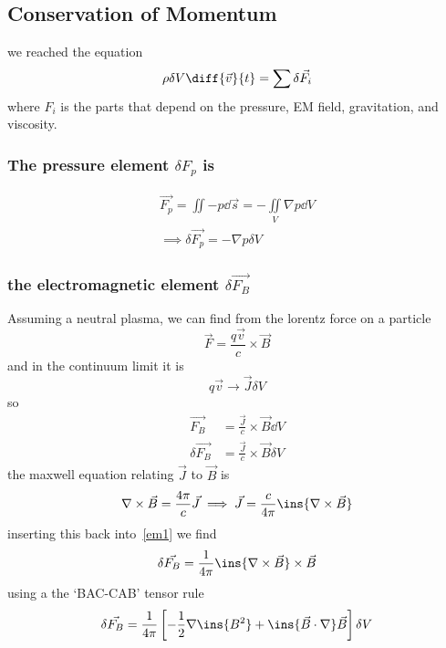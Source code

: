 \subsection{Conservation of Momentum}
we reached the equation
\begin{equation}\label{alltheforces}
    \rho\delta V \diff{\vec{v}}{t} = \sum \delta \vec{F_i}
\end{equation}
where \(F_i\) is the parts that depend on the pressure, EM field, gravitation, and viscosity. 
\subsubsection{The pressure element \(\delta F_p\) is}
\begin{align}
    \vec{F_p} = \iint -p\dd \vec{s} = -\iint\limits_V \nabla p \dd V\\
    \implies \delta \vec{F_p} = -\nabla p\delta V
\end{align}
\subsubsection{the electromagnetic element \(\delta\vec{F_B}\)} Assuming a neutral plasma, we can find from the lorentz force on a particle
\begin{equation}
    \vec{F} = \frac{q\vec{v}}{c}\times\vec{B}
\end{equation}
and in the continuum limit it is
\begin{equation}
    q\vec{v} \rightarrow \vec{J}\delta V
\end{equation}
so
\begin{align}
    \vec{F_B} &= \frac{\vec{J}}{c}\times \vec{B} \dd V\\
    \delta\vec{F_B} &= \frac{\vec{J}}{c}\times \vec{B}\delta V \label{em1}
\end{align}
the maxwell equation relating \(\vec{J}\) to \(\vec{B}\) is
\begin{equation}
    \nabla\times\vec{B} = \frac{4\pi}{c}\vec{J} \implies \vec{J} = \frac{c}{4\pi}\ins{\nabla\times\vec{B}}
\end{equation}
inserting this back into~\ref{em1} we find
\begin{equation}
    \delta\vec{F_B} = \frac{1}{4\pi}\ins{\nabla\times\vec{B}}\times\vec{B}
\end{equation}
using a the `BAC-CAB' tensor rule
\begin{equation}
    \delta\vec{F_B} = \frac{1}{4\pi}\left[-\frac{1}{2}\nabla\ins{B^2}+\ins{\vec{B}\cdot\nabla}\vec{B}\right]\delta V
\end{equation}
